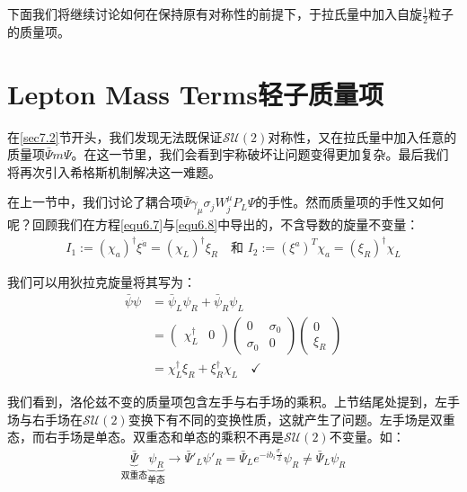 下面我们将继续讨论如何在保持原有对称性的前提下，于拉氏量中加入自旋$\frac{1}{2}$粒子的质量项。


\section[轻子质量项]{Lepton Mass Terms\quad 轻子质量项}\label{sec7.5}

在\ref{sec7.2}节开头，我们发现无法既保证$\mathcal{SU}(2)$对称性，又在拉氏量中加入任意的质量项$\bar{\Psi}m\Psi$。在这一节里，我们会看到宇称破坏让问题变得更加复杂。最后我们将再次引入希格斯机制解决这一难题。

在上一节中，我们讨论了耦合项$\bar{\Psi}\gamma_\mu\sigma_jW_j^\mu P_L\Psi$的手性。然而质量项的手性又如何呢？回顾我们在方程\eqref{equ6.7}与\eqref{equ6.8}中导出的，不含导数的旋量不变量：
\begin{align}
I_1:=(\chi_a)^\dag\xi^{\dot a}=(\chi_L)^\dag\xi_R\quad\text{和 }I_2:=(\xi^a)^T\chi_a=(\xi_R)^\dag\chi_L
\label{equ7.113}
\end{align}

我们可以用狄拉克旋量将其写为：
\begin{align}
\bar{\psi}\psi&=\bar{\psi}_L\psi_R+\bar{\psi}_R\psi_L\nonumber\\
&=\begin{pmatrix}\chi_L^\dag & 0\end{pmatrix}\begin{pmatrix}0 & \sigma_0 \\ \sigma_0 & 0\end{pmatrix}\begin{pmatrix}0 \\ \xi_R\end{pmatrix}\nonumber\\
&=\chi_L^\dag\xi_R+\xi_R^\dag\chi_L\quad\checkmark
\label{equ7.114}
\end{align}

我们看到，洛伦兹不变的质量项包含左手与右手场的乘积。上节结尾处提到，左手场与右手场在$\mathcal{SU}(2)$变换下有不同的变换性质，这就产生了问题。左手场是双重态，而右手场是单态。双重态和单态的乘积不再是$\mathcal{SU}(2)$不变量。如：
\begin{align}
\underbrace{\bar{\Psi}}_\text{双重态}\underbrace{\psi_R}_\text{单态}\rightarrow \bar{\Psi}'_L\psi'_R=\bar{\Psi}_Le^{-ib_i\frac{\sigma_i}{2}}\psi_R\ne \bar{\Psi}_L\psi_R
\label{equ7.115}
\end{align}

